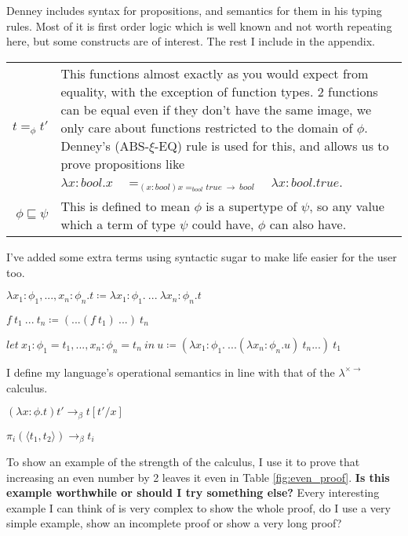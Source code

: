 Denney includes syntax for propositions, and semantics for them in his typing rules.
Most of it is first order logic which is well known and not worth repeating here, but some constructs
are of interest.
The rest I include in the appendix.

\begin{tabular}{r|p{}}
    $t =_\phi t'$ &
    This functions almost exactly as you would expect from equality, with the exception of function types.
    2 functions can be equal even if they don't have the same image, we only care about functions
    restricted to the domain of $\phi$.
    Denney's (ABS-$\xi$-EQ) rule is used for this, and allows us to prove propositions like\newline
    $\lambda x: bool . x \quad =_{(x:bool) x =_{bool} true\ \rightarrow\ bool} \quad \lambda x: bool . true$.
    \\\cline{1-2}
    $\phi \sqsubseteq \psi$ &
    This is defined to mean $\phi$ is a supertype of $\psi$,
    so any value which a term of type $\psi$ could have, $\phi$ can also have.
\end{tabular}

I've added some extra terms using syntactic sugar to make life easier for the user too.

\begin{center}
    $\lambda x_1: \phi_1, ..., x_n: \phi_n . t \coloneqq \lambda x_1: \phi_1 .\ ...\ \lambda x_n: \phi_n . t$

    $f\ t_1\ ...\ t_n \coloneqq (...(f\ t_1)\ ...)\ t_n$

    $let\ x_1: \phi_1 = t_1, ..., x_n: \phi_n = t_n\ in\ u \coloneqq (\lambda x_1: \phi_1 .\ ...(\lambda x_n: \phi_n . u)\ t_n...)\ t_1$
\end{center}

I define my language's operational semantics in line with that of the $\lambda^{\times \rightarrow}$ calculus.

\begin{center}
    $(\lambda x: \phi . t) t' \rightarrow_\beta t[t'/x]$

    $\pi_i(\langle t_1, t_2 \rangle) \rightarrow_\beta t_i$
\end{center}

To show an example of the strength of the calculus, I use it to prove that increasing an even number by
2 leaves it even in Table \ref{fig:even_proof}.
\textbf{Is this example worthwhile or should I try something else?}
Every interesting example I can think of is very complex to show the whole proof,
do I use a very simple example, show an incomplete proof or show a very long proof?

